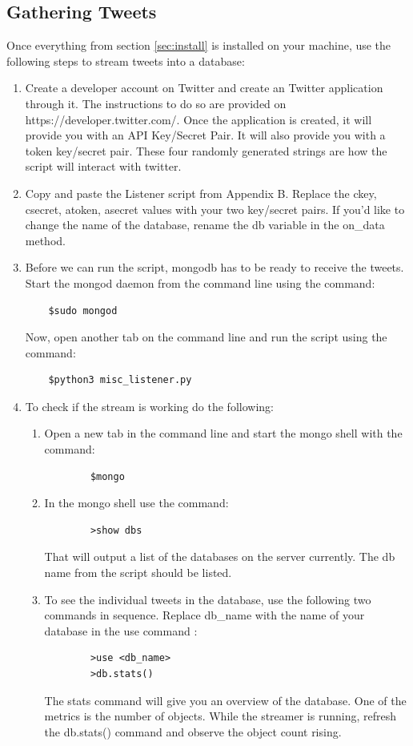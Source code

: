 \documentclass[11pt, twoside, reqno]{book}
\begin{document}
\begin{appendices}
\section{Gathering Tweets}
\label{sec:collectingtweets}
Once everything from section \ref{sec:install} is installed on your machine, use the following steps to stream tweets into a database:
\begin{enumerate}
	\item Create a developer account on Twitter and create an Twitter application through it. The instructions to do so are provided on https://developer.twitter.com/. Once the application is created, it will provide you with an API Key/Secret Pair. It will also provide you with a token key/secret pair. These four randomly generated strings are how the script will interact with twitter. 
	
	\item Copy and paste the Listener script from Appendix B. Replace the ckey, csecret, atoken, asecret values with your two key/secret pairs. If you'd like to change the name of the database, rename the db variable in the on\_data method. 
	
	\item Before we can run the script, mongodb has to be ready to receive the tweets. Start the mongod daemon from the command line using the command:
	\begin{verbatim}
	$sudo mongod
	\end{verbatim}
	Now, open another tab on the command line and run the script using the command:
	\begin{verbatim}
	$python3 misc_listener.py
	\end{verbatim}
	
	\item To check if the stream is working do the following:
	\begin{enumerate}
		\item Open a new tab in the command line and start the mongo shell with the command:
		\begin{verbatim}
		$mongo
		\end{verbatim}
		\item In the mongo shell use the command:
		\begin{verbatim}
		>show dbs
		\end{verbatim}
		That will output a list of the databases on the server currently. The db name from the script should be listed. 
		\item To see the individual tweets in the database, use the following two commands in sequence. Replace db\_name with the name of your database in the use command :
		\begin{verbatim}
		>use <db_name>
		>db.stats()
		\end{verbatim}
		The stats command will give you an overview of the database. One of the metrics is the number of objects. While the streamer is running, refresh the db.stats() command and observe the object count rising. 
	\end{enumerate}
\end{enumerate}


\end{appendices}
\end{document}
